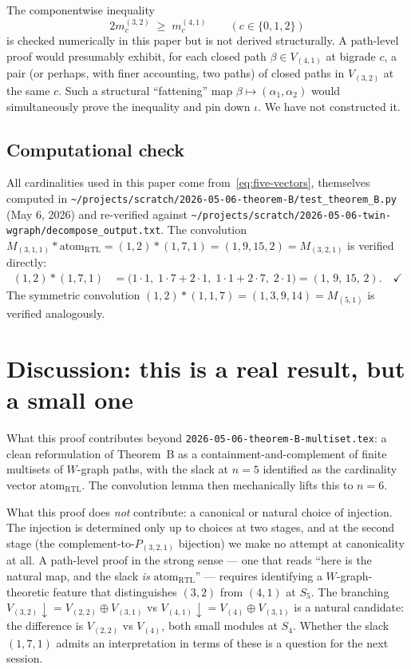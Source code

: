 \documentclass[11pt]{article}
\theoremstyle{definition}
\begin{document}
The componentwise inequality
\[
2 m_c^{(3,2)} \;\geq\; m_c^{(4,1)} \qquad (c \in \{0, 1, 2\})
\]
is checked numerically in this paper but is not derived structurally. A path-level proof would presumably exhibit, for each closed path $\beta \in V_{(4,1)}$ at bigrade $c$, a pair (or perhaps, with finer accounting, two paths) of closed paths in $V_{(3,2)}$ at the same $c$. Such a structural ``fattening'' map $\beta \mapsto (\alpha_1, \alpha_2)$ would simultaneously prove the inequality and pin down $\iota$. We have not constructed it.

\subsection*{Computational check}

All cardinalities used in this paper come from~\eqref{eq:five-vectors}, themselves computed in \texttt{\textasciitilde/projects/scratch/2026-05-06-theorem-B/test\_theorem\_B.py} (May 6, 2026) and re-verified against \texttt{\textasciitilde/projects/scratch/2026-05-06-twin-wgraph/decompose\_output.txt}. The convolution $M_{(3,1,1)} \ast \mathrm{atom}_{\mathrm{RTL}} = (1,2) \ast (1,7,1) = (1,9,15,2) = M_{(3,2,1)}$ is verified directly:
\begin{align*}
(1,2) \ast (1,7,1) &= \bigl(1\cdot 1,\; 1\cdot 7 + 2 \cdot 1,\; 1\cdot 1 + 2 \cdot 7,\; 2 \cdot 1\bigr) = (1,\, 9,\, 15,\, 2). \quad \checkmark
\end{align*}
The symmetric convolution $(1,2) \ast (1,1,7) = (1, 3, 9, 14) = M_{(5,1)}$ is verified analogously.

\section{Discussion: this is a real result, but a small one}

What this proof contributes beyond \texttt{2026-05-06-theorem-B-multiset.tex}: a clean reformulation of Theorem~B as a containment-and-complement of finite multisets of $W$-graph paths, with the slack at $n=5$ identified as the cardinality vector $\mathrm{atom}_{\mathrm{RTL}}$. The convolution lemma then mechanically lifts this to $n=6$.

What this proof does \emph{not} contribute: a canonical or natural choice of injection. The injection is determined only up to choices at two stages, and at the second stage (the complement-to-$P_{(3,2,1)}$ bijection) we make no attempt at canonicality at all. A path-level proof in the strong sense --- one that reads ``here is the natural map, and the slack \emph{is} $\mathrm{atom}_{\mathrm{RTL}}$'' --- requires identifying a $W$-graph-theoretic feature that distinguishes $(3,2)$ from $(4,1)$ at $S_5$. The branching $V_{(3,2)} \downarrow = V_{(2,2)} \oplus V_{(3,1)}$ vs $V_{(4,1)} \downarrow = V_{(4)} \oplus V_{(3,1)}$ is a natural candidate: the difference is $V_{(2,2)}$ vs $V_{(4)}$, both small modules at $S_4$. Whether the slack $(1,7,1)$ admits an interpretation in terms of these is a question for the next session.
\end{document}
